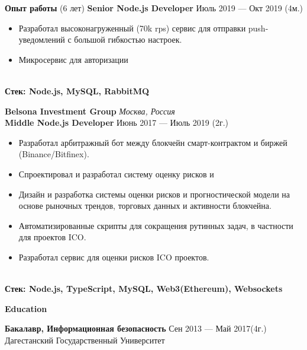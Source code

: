 \documentclass{resume}
\begin{document}
\begin{rSection}{\textbf{Опыт работы} (6 лет) }
    \textbf{Senior Node.js Developer} \hfill Июль 2019 --- Окт 2019 (4м.)
    \begin{itemize}
        \setlength\itemsep{-0.4em}
        \item Разработал высоконагруженный (70k rps) сервис для отправки push-уведомлений с большой гибкостью настроек.
        \item Микросервис для авторизации
    \end{itemize}
    \\\textbf{Стек: Node.js, MySQL, RabbitMQ}

    \textbf{Belsona Investment Group} \hfill \textit{Москва, Россия} \\
    \textbf{Middle Node.js Developer}  \hfill Июнь 2017 --- Июль 2019 (2г.)

    \begin{itemize}
        \setlength\itemsep{-0.4em}
        \item Разработал арбитражный бот между блокчейн смарт-контрактом и биржей (Binance/Bitfinex).
        \item Спроектировал и разработал систему оценку рисков и
        \item Дизайн и разработка системы оценки рисков и прогностической модели на основе рыночных трендов, торговых данных и активности блокчейна.
        \item Автоматизированные скрипты для сокращения рутинных задач, в частности для проектов ICO\@.
        \item Разработал сервис для оценки рисков ICO проектов.
    \end{itemize}
    \\\textbf{Стек: Node.js, TypeScript, MySQL, Web3(Ethereum), Websockets}

\end{rSection}


\begin{rSection}{\textbf{Education}}

    \textbf{Бакалавр, Информационная безопасность } \hfill {Сен 2013 --- Май 2017(4г.)} \\
    Дагестанский Государственный Университет

\end{rSection}
\end{document}
